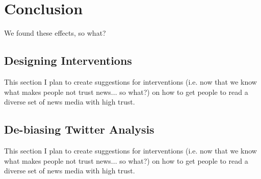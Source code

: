 \chapter{Conclusion}
We found these effects, so what?
 
\section{Designing Interventions}
This section I plan to create suggestions for interventions (i.e. now that we know what makes people not trust news... so what?) on how to get people to read a diverse set of news media with high trust.


\section{De-biasing Twitter Analysis}
This section I plan to create suggestions for interventions (i.e. now that we know what makes people not trust news... so what?) on how to get people to read a diverse set of news media with high trust.